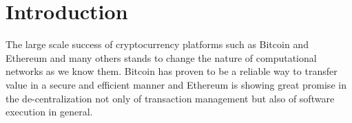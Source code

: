 
\section{Introduction}

The large scale success of cryptocurrency platforms such as Bitcoin  \cite{nakamoto2008bitcoin} and Ethereum \cite{wood2014ethereum} and many others stands to change the nature of computational networks as we know them. Bitcoin has proven to be a reliable way to transfer value in a secure and efficient manner and Ethereum is showing great promise in the de-centralization not only of transaction management but also of software execution in general. 